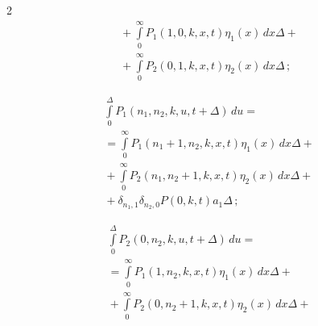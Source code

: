 \begin{multicols}{2}
\begin{multline}
{}+


\int\limits_0^{\infty}P_1(1,0,k,x,t)\eta_1(x)\,dx\Delta+{}\\


{}+\int\limits_0^{\infty}P_2(0,1,k,x,t)\eta_2(x)\,dx\Delta\,;


\label{before3}


\end{multline}





\vspace*{-10pt}





\noindent


\begin{multline}


\int\limits_0^\Delta P_1\left(n_1,n_2,k,u,t+\Delta\right)\,du={}\\


{}=


\int\limits_0^{\infty}P_1\left(n_1+1,n_2,k,x,t\right)\eta_1(x)\,dx\Delta+{}\\


{}+\int\limits_0^{\infty}P_2\left(n_1,n_2+1,k,x,t\right)\eta_2(x)\,dx\Delta+{}\\


{}+


\delta_{n_1,1}\delta_{n_2,0}P(0,k,t)a_1\Delta\,;


\label{before4}


\end{multline}










\noindent


\begin{multline}


\int\limits_0^\Delta P_2\left(0,n_2,k,u,t+\Delta\right)\,du={}\\


{}=


\int\limits_0^{\infty}P_1\left(1,n_2,k,x,t\right)\eta_1(x)\,dx\Delta+{}


\\


{}+\int\limits_0^{\infty}P_2\left(0,n_2+1,k,x,t\right)\eta_2(x)\,dx\Delta+{}\\



\end{multline}
\end{multicols}
